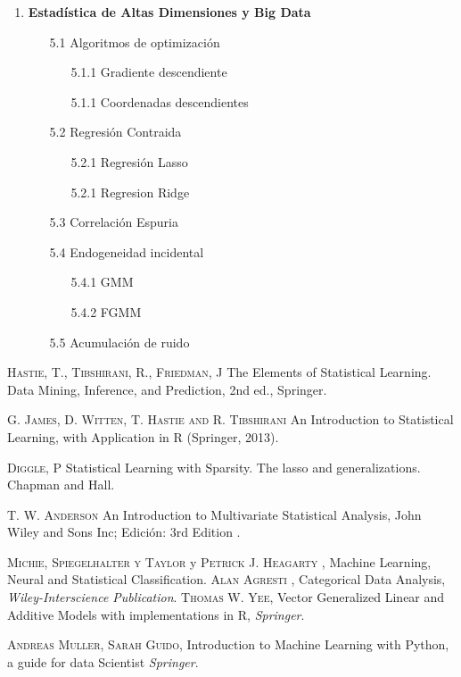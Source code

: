 \documentclass[11pt]{report}
\begin{document}
\begin{enumerate}
\item \textbf{Estadística de Altas Dimensiones y  Big Data}
\begin{itemize}
\item[5.1] Algoritmos de optimización
\begin{itemize}
\item[5.1.1] Gradiente descendiente
\item[5.1.1] Coordenadas descendientes
\end{itemize}
\item[5.2] Regresión Contraida
\begin{itemize}
\item[5.2.1] Regresión Lasso
\item[5.2.1] Regresion Ridge
\end{itemize}
\item[5.3] Correlación Espuria 
\item[5.4] Endogeneidad incidental
\begin{itemize}
\item[5.4.1] GMM
\item[5.4.2] FGMM 
 \end{itemize}
 \item[5.5] Acumulación de ruido

\end{itemize}

\end{enumerate}


\begin{thebibliography}{X}

 \textsc{Hastie, T., Tibshirani, R., Friedman, J} The Elements of Statistical Learning. Data Mining, Inference, and Prediction, 2nd ed., Springer.

  \textsc{G. James, D. Witten, T. Hastie and R. Tibshirani}  An Introduction to Statistical Learning, with Application in R  (Springer, 2013).

 \textsc{Diggle, P} 
Statistical Learning with Sparsity. The lasso and generalizations. Chapman and Hall.


 \textsc{T. W. Anderson} An Introduction to Multivariate Statistical Analysis, John Wiley and Sons Inc; Edición: 3rd Edition .

 \textsc{Michie, Spiegelhalter y Taylor} y \textsc{Petrick J. Heagarty }, Machine Learning, Neural and Statistical Classification.
 \textsc{Alan Agresti } ,
Categorical Data Analysis,
\textit{ Wiley-Interscience Publication}.
 \textsc{Thomas W. Yee},
Vector Generalized Linear and Additive Models with implementations in R,
\textit{Springer}. 

 \textsc{Andreas Muller, Sarah Guido},
Introduction to Machine Learning with Python, a guide for data Scientist
\textit{Springer}. 

\end{thebibliography}
\end{document}
